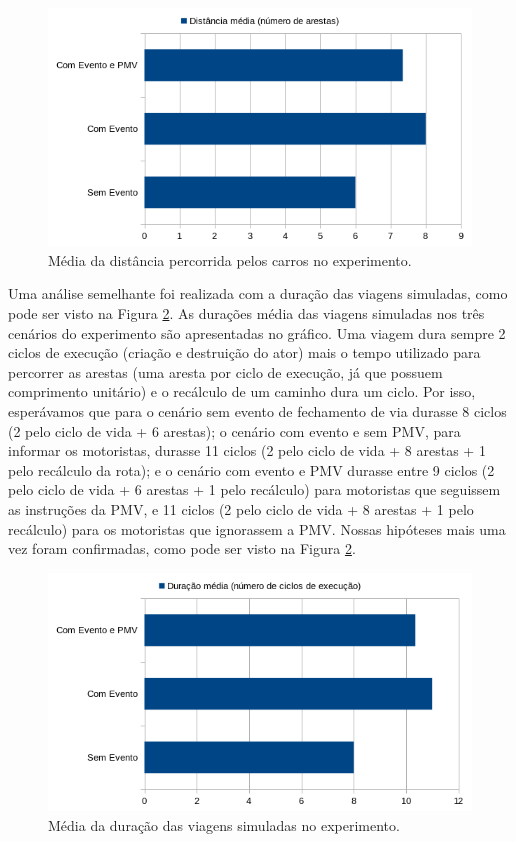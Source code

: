 \begin{figure}[ht]
	\centering
	\includegraphics[width=\textwidth]{figuras/distancia_validacao.png}
	\caption{Média da distância percorrida pelos carros no experimento.}
	\label{fig:distancia_validacao}
\end{figure}

Uma análise semelhante foi realizada com a duração das viagens simuladas, como pode ser visto na Figura \ref{fig:duracao_validacao}.
As durações média das viagens simuladas nos três cenários do experimento são apresentadas no gráfico.
Uma viagem dura sempre 2 ciclos de execução (criação e destruição do ator) mais o tempo utilizado para percorrer as arestas (uma aresta por ciclo de execução, já que possuem comprimento unitário)
e o recálculo de um caminho dura um ciclo.
Por isso, esperávamos que para o cenário sem evento de fechamento de via durasse 8 ciclos (2 pelo ciclo de vida + 6 arestas);
o cenário com evento e sem PMV, para informar os motoristas, durasse 11 ciclos (2 pelo ciclo de vida + 8 arestas + 1 pelo recálculo da rota);
e o cenário com evento e PMV durasse entre 9 ciclos (2 pelo ciclo de vida + 6 arestas + 1 pelo recálculo) para motoristas que seguissem as instruções da PMV, e 11 ciclos (2 pelo ciclo de vida + 8 arestas +
1 pelo recálculo) para os motoristas que ignorassem a PMV.
Nossas hipóteses mais uma vez foram confirmadas, como pode ser visto na Figura \ref{fig:duracao_validacao}.

\begin{figure}[ht]
	\centering
	\includegraphics[width=\textwidth]{figuras/duracao_validacao.png}
	\caption{Média da duração das viagens simuladas no experimento.}
	\label{fig:duracao_validacao}
\end{figure}


